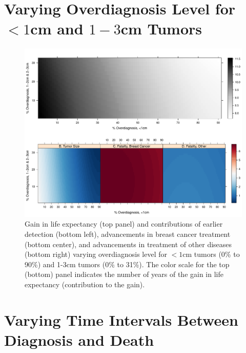 \documentclass[11pt,letterpaper]{article}
\theoremstyle{plain}
\theoremstyle{remark}
\numberwithin{equation}{section}
\begin{document}
\section{Varying Overdiagnosis Level for $<1$cm and $1-3$cm Tumors}
\begin{figure}[h]
\begin{center}
\includegraphics[width=\linewidth]{appendix_figure2}
\caption{Gain in life expectancy (top panel) and
  contributions of earlier detection (bottom left), advancements in
  breast cancer treatment (bottom center), and advancements in
  treatment of other diseases (bottom right) varying overdiagnosis
  level for $<1$cm tumors (0\% to 90\%) and 1-3cm tumors (0\% to
  31\%).  The color scale for the top (bottom) panel indicates the
number of years of the gain in life expectancy (contribution to the gain).}
\label{fig:simple_case}
\end{center}
\end{figure}

\newpage
\section{Varying Time Intervals Between Diagnosis and Death}
\end{document}

